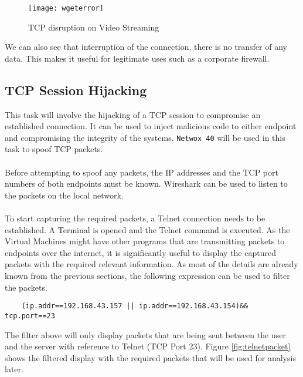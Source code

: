\documentclass[a4paper,12pt]{article}
\begin{document}
\begin{figure}[H]
	\centering
	\texttt{[image: wgeterror]}
	\caption{TCP disruption on Video Streaming}
	\label{fig:wgeterror}
\end{figure}
\noindent We can also see that interruption of the connection, there is no transfer of any data. This makes it useful for legitimate uses such as a corporate firewall.
\subsection{TCP Session Hijacking}
\begin{par}This task will involve the hijacking of a TCP session to compromise an established connection. It can be used to inject malicious code to either endpoint and compromising the integrity of the systems. \texttt{Netwox 40} will be used in this task to spoof TCP packets.\\\\Before attempting to spoof any packets, the IP addresses and the TCP port numbers of both endpoints must be known. Wireshark can be used to listen to the packets on the local network. \\\\To start capturing the required packets, a Telnet connection needs to be established. A Terminal is opened and the Telnet command is executed. As the Virtual Machines might have other programs that are transmitting packets to endpoints over the internet, it is significantly useful to display the captured packets with the required relevant information. As most of the details are already known from the previous sections, the following expression can be used to filter the packets.
	\end{par}
	\begin{verbatim}
	(ip.addr==192.168.43.157 || ip.addr==192.168.43.154)&& tcp.port==23
	\end{verbatim}
	\begin{par}
	\noindent The filter above will only display packets that are being sent between the user and the server with reference to Telnet (TCP Port 23). Figure \ref{fig:telnetpacket} shows the filtered display with the required packets that will be used for analysis later.\end{par}
	
\end{document}
